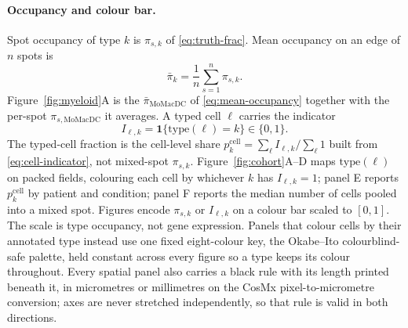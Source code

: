 \paragraph{Occupancy and colour bar.}
Spot occupancy of type \(k\) is \(\pi_{s,k}\) of \eqref{eq:truth-frac}. Mean occupancy on an edge of \(n\) spots is
\begin{equation}
\bar\pi_{k}=\frac{1}{n}\sum_{s=1}^{n}\pi_{s,k}.
\label{eq:mean-occupancy}
\end{equation}
Figure~\ref{fig:myeloid}A is the \(\bar\pi_{\mathrm{MoMacDC}}\) of \eqref{eq:mean-occupancy} together with the per-spot \(\pi_{s,\mathrm{MoMacDC}}\) it averages. A typed cell \(\ell\) carries the indicator
\begin{equation}
I_{\ell,k}=\mathbf{1}\{\mathrm{type}(\ell)=k\}\in\{0,1\}.
\label{eq:cell-indicator}
\end{equation}
The typed-cell fraction is the cell-level share \(p_{k}^{\mathrm{cell}}=\sum_{\ell}I_{\ell,k}/\sum_{\ell}1\) built from \eqref{eq:cell-indicator}, not mixed-spot \(\pi_{s,k}\). Figure~\ref{fig:cohort}A--D maps \(\mathrm{type}(\ell)\) on packed fields, colouring each cell by whichever \(k\) has \(I_{\ell,k}=1\); panel E reports \(p_{k}^{\mathrm{cell}}\) by patient and condition; panel F reports the median number of cells pooled into a mixed spot. Figures encode \(\pi_{s,k}\) or \(I_{\ell,k}\) on a colour bar scaled to \([0,1]\). The scale is type occupancy, not gene expression. Panels that colour cells by their annotated type instead use one fixed eight-colour key, the Okabe--Ito colourblind-safe palette, held constant across every figure so a type keeps its colour throughout. Every spatial panel also carries a black rule with its length printed beneath it, in micrometres or millimetres on the CosMx pixel-to-micrometre conversion; axes are never stretched independently, so that rule is valid in both directions.

